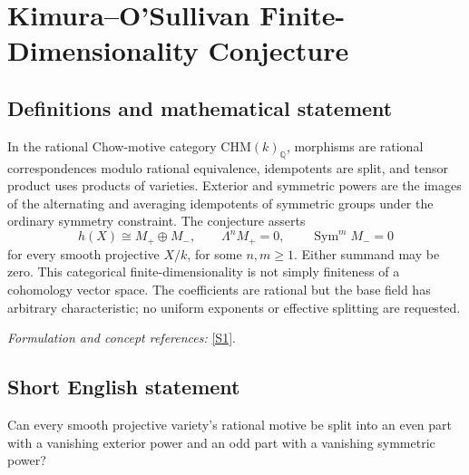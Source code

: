 \documentclass[11pt,a4paper]{article}
\newcommand{\Q}{\mathbb{Q}}
\newcommand{\sref}[2]{\hyperlink{source:#1:#2}{[S#2]}}
\newif\ifshowcatalogue
\newcommand{\cataloguescope}[1]{\ifshowcatalogue
 \paragraph{Exact scope in the supplied catalogue.}
 \begin{quote}\small #1\end{quote}\fi}
\numberwithin{equation}{section}
\begin{document}
\setcounter{section}{0}
\clearpage
\section*{\texorpdfstring{Kimura–O'Sullivan Finite-Dimensionality Conjecture}{Kimura–O'Sullivan Finite-Dimensionality Conjecture}}\label{30006782}
\subsection{Definitions and mathematical statement}
In the rational Chow-motive category $\mathrm{CHM}(k)_{\Q}$, morphisms are rational correspondences modulo rational equivalence, idempotents are split, and tensor product uses products of varieties. Exterior and symmetric powers are the images of the alternating and averaging idempotents of symmetric groups under the ordinary symmetry constraint. The conjecture asserts
\[
 h(X)\cong M_+\oplus M_-,\qquad
 \Lambda^n M_+=0,\qquad\operatorname{Sym}^m M_-=0
\]
for every smooth projective $X/k$, for some $n,m\ge1$. Either summand may be zero. This categorical finite-dimensionality is not simply finiteness of a cohomology vector space. The coefficients are rational but the base field has arbitrary characteristic; no uniform exponents or effective splitting are requested.
\par\smallskip\textit{Formulation and concept references:} \sref{30006782}{1}.
\cataloguescope{For every field k and every smooth projective variety X over k, the Chow motive h(X) with rational coefficients in the ordinary symmetric, pseudo-abelian category CHM(k)\_Q is Kimura–O'Sullivan finite-dimensional: there exist motives M+ and M\ensuremath{-} and positive integers n,m such that h(X) is isomorphic to M+ direct-sum M\ensuremath{-}, the exterior power \ensuremath{\Lambda}\textasciicircum{}n(M+) is zero, and the symmetric power Sym\textasciicircum{}m(M\ensuremath{-}) is zero. The summands may be zero. The field k is unrestricted; characteristic zero applies to the rational coefficient field, not to k. No effective construction, uniform n,m or classification is required.}
\subsection{Short English statement}
Can every smooth projective variety's rational motive be split into an even part with a vanishing exterior power and an odd part with a vanishing symmetric power?
\end{document}
